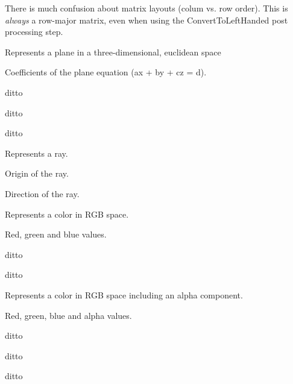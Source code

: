 There is much confusion about matrix layouts (colum vs. row order). This is {\itshape always} a row-\/major matrix, even when using the {\ttfamily Convert\+To\+Left\+Handed} post processing step.

Represents a plane in a three-\/dimensional, euclidean space

Coefficients of the plane equation ({\ttfamily ax + by + cz = d}).

ditto

ditto

ditto

Represents a ray.

Origin of the ray.

Direction of the ray.

Represents a color in R\+G\+B space.

Red, green and blue values.

ditto

ditto

Represents a color in R\+G\+B space including an alpha component.

Red, green, blue and alpha values.

ditto

ditto

ditto 